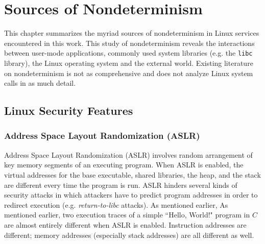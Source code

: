 \newenvironment{mylisting}
{\begin{list}{}{\setlength{\leftmargin}{1em}}\item\scriptsize\bfseries}
{\end{list}}

\chapter{Sources of Nondeterminism}
This chapter summarizes the myriad sources of nondeterminism
in Linux services encountered in this work. This
study of nondeterminism reveals
the interactions between user-mode
applications, commonly used system libraries (e.g. the \texttt{libc} library),
the Linux operating system and the external world.
Existing literature on nondeterminism is not 
as comprehensive and does not analyze
Linux system calls in as much detail. 


\section{Linux Security Features} \label{ch3:security}
\subsection{Address Space Layout Randomization (ASLR)}
Address Space Layout Randomization (ASLR) involves random arrangement of
key memory segments of an executing program. When ASLR is enabled,
the virtual addresses for the base executable, shared libraries, 
the heap, and the stack are different every time the program is run.
ASLR hinders several kinds of security attacks in which attackers have to predict
program addresses in order to redirect execution (e.g.
\emph{return-to-libc} attacks). 
As mentioned earlier, As mentioned earlier, two execution traces of a
simple ``Hello, World!" program in $C$ are almost entirely different
when ASLR is enabled. Instruction addresses are different; 
memory addresses (especially stack addresses) are all different as well.

